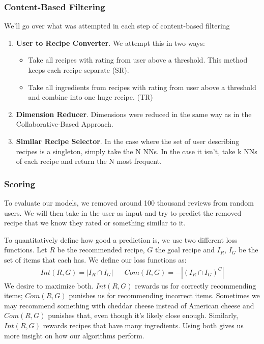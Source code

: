 \documentclass[11pt]{article}
\begin{document}
\subsubsection{Content-Based Filtering}
We'll go over what was attempted in each step of content-based filtering
\begin{enumerate}
    \item \textbf{User to Recipe Converter}. We attempt this in two ways:
    \begin{itemize}
        \item Take all recipes with rating from user above a threshold. This method keeps each recipe separate (SR).
        \item Take all ingredients from recipes with rating from user above a threshold and combine into one huge recipe. (TR) 
    \end{itemize}
    \item \textbf{Dimension Reducer}. Dimensions were reduced in the same way as in the Collaborative-Based Approach.
    \item \textbf{Similar Recipe Selector}. In the case where the set of user describing recipes is a singleton, simply take the N NNs. In the case it isn't, take k NNs of each recipe and return the N most frequent.
\end{enumerate}

\subsubsection{Scoring}

To evaluate our models, we removed around 100 thousand reviews from random users. We will then take in the user as input and try to predict the removed recipe that we know they rated or something similar to it.

To quantitatively define how good a prediction is, we use two different loss functions.  Let $R$ be the recommended recipe, $G$ the goal recipe and $I_R$, $I_G$ be the set of items that each has. We define our loss functions as:
\begin{align}
    Int(R,G) = |I_R \cap I_G| && Com(R,G) = -|(I_R \cap I_G)^C|
\end{align}
We desire to maximize both. $Int(R,G)$ rewards us for correctly recommending items; $Com(R,G)$ punishes us for recommending incorrect items. Sometimes we may recommend something with cheddar cheese instead of American cheese and $Com(R,G)$ punishes that, even though it's likely close enough. Similarly, $Int(R,G)$ rewards recipes that have many ingredients. Using both gives us more insight on how our algorithms perform.
\end{document}
